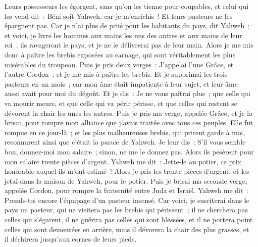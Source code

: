 \begin{multicols}{2}
Leurs possesseurs les égorgent, sans qu'on les tienne pour coupables, et celui qui les vend dit~: Béni soit Yahweh, car je m'enrichis~! Et leurs pasteurs ne les épargnent pas.
Car je n'ai plus de pitié pour les habitants du pays, dit Yahweh~; et voici, je livre les hommes aux mains les uns des autres et aux mains de leur roi~; ils ravageront le pays, et je ne le délivrerai pas de leur main.
Alors je me mis donc à paître les brebis exposées au carnage, qui sont véritablement les plus misérables du troupeau. Puis je pris deux verges~: J'appelai l'une Grâce, et l'autre Cordon~; et je me mis à paître les brebis.
Et je supprimai les trois pasteurs en un mois~; car mon âme était impatiente à leur sujet, et leur âme aussi avait pour moi du dégoût.
Et je dis~: Je ne vous paîtrai plus~; que celle qui va mourir meure, et que celle qui va périr périsse, et que celles qui restent se dévorent la chair les unes les autres.
Puis je pris ma verge, appelée Grâce, et je la brisai, pour rompre mon alliance que j'avais traitée avec tous ces peuples.
Elle fut rompue en ce jour-là~; et les plus malheureuses brebis, qui prirent garde à moi, reconnurent ainsi que c'était la parole de Yahweh.
Je leur dis~: S'il vous semble bon, donnez-moi mon salaire~; sinon, ne me le donnez pas. Alors ils pesèrent pour mon salaire trente pièces d'argent.
Yahweh me dit~: Jette-le au potier, ce prix honorable auquel ils m'ont estimé~! Alors je pris les trente pièces d'argent, et les jetai dans la maison de Yahweh, pour le potier.
Puis je brisai ma seconde verge, appelée Cordon, pour rompre la fraternité entre Juda et Israël.
Yahweh me dit~: Prends-toi encore l'équipage d'un pasteur insensé.
Car voici, je susciterai dans le pays un pasteur, qui ne visitera pas les brebis qui périssent~; il ne cherchera pas celles qui s'égarent, il ne guérira pas celles qui sont blessées, et il ne portera point celles qui sont demeurées en arrière, mais il dévorera la chair des plus grasses, et il déchirera jusqu'aux cornes de leurs pieds.

\end{multicols}
